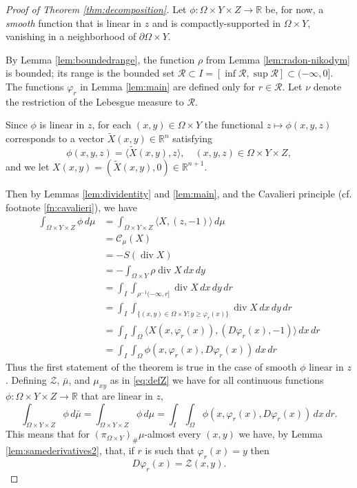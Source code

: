 \documentclass{article}
\newcommand{\R}{\mathbb{R}}
\theoremstyle{definition}
\theoremstyle{remark}
\newcommand{\proj}{\pi}
\newcommand{\projXY}{\proj_{\Omega\times Y}}
\begin{document}
\begin{proof}[Proof of Theorem \ref{thm:decomposition}]  
Let $\phi\colon\Omega\times Y\times Z\to\R$ be, for now, a \emph{smooth} function that is linear in $z$ and is compactly-supported in $\Omega\times Y$, vanishing in a neighborhood of $\partial \Omega\times Y$. 

By Lemma \ref{lem:boundedrange}, the function $\rho$ from Lemma \ref{lem:radon-nikodym} is bounded; its range is the bounded set ${\mathcal R\subset I=[\inf\mathcal R,\sup\mathcal R]}\subset(-\infty,0]$. The functions $\varphi_r$  in Lemma \ref{lem:main} are defined only for $r\in  {\mathcal R}$. Let $\nu$ denote the restriction of 
{the} Lebesgue measure to ${\mathcal R}$.

%

%
 Since $\phi$ is linear in $z$, for each $(x,y)\in\Omega\times Y$ the functional $z\mapsto \phi(x,y,z)$ corresponds to a vector $\tilde X(x,y)\in\R^n$ satisfying
 \[\phi(x,y,z)=\langle\tilde X(x,y),z\rangle,\quad (x,y,z)\in\Omega\times Y\times Z,\]
 and we let $X(x,y)=(\tilde X(x,y),0)\in\R^{n+1}$.
 
 Then by Lemmas \ref{lem:dividentity} and \ref{lem:main}{, and the Cavalieri principle (cf. footnote \ref{fn:cavalieri}),} we have
 \begin{align*}
  \int_{\Omega\times Y\times Z}\phi\,d\mu&=\int_{\Omega\times Y\times Z}\langle X,(z,-1)\rangle\,d\mu\\
  &={\mathcal C_\mu}(X)\\
  &=-S(\operatorname{div} X)\\
  &=-\int_{\Omega\times Y} \rho\operatorname{div} X\,dx\,dy\\
  &=\int_{I}\int_{\rho^{-1}(-\infty,r]} \operatorname{div} X\,dx\,dy\,dr\\
  &=\int_{I}\int_{\{(x,y)\in\Omega\times Y:y\geq \varphi_r(x)\}}\operatorname{div} X\,dx\,dy\,dr\\
  &=\int_{I} \int_{\Omega} \langle X(x,\varphi_r(x)),(D\varphi_r(x),-1)\rangle \,dx\,dr\\
  &=\int_{I}\int_\Omega \phi(x,\varphi_r(x),D\varphi_r(x)) %
  \,dx\,dr
 \end{align*}
%
 Thus the first statement of the theorem is true in the case of smooth $\phi$ linear in $z$. Defining $\mathcal Z$, $\bar\mu$, and $\mu_{xy}$ as in \eqref{eq:defZ}
 we have for all continuous functions $\phi\colon\Omega\times Y\times Z\to \R$ that are linear in $z$, 
\begin{equation}\label{eq:linearinz}
 \int_{\Omega\times Y\times Z}\phi\,d\bar\mu=\int_{\Omega\times Y\times Z}\phi\,d\mu=\int_{I}\int_\Omega\phi(x,\varphi_r(x),D\varphi_r(x))\,dx\,dr.
\end{equation}
This means that for $(\projXY)_\#\mu$-almost every $(x,y)$ we have, by Lemma \ref{lem:samederivatives2}, that, if $r$ is such that $\varphi_r(x)=y$ then
\begin{equation}\label{eq:singlepoint}
 D\varphi_r(x)=\mathcal Z(x,y).
\end{equation}


\end{proof}
\end{document}
